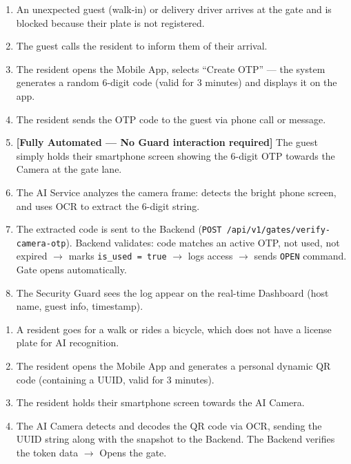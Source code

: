 \documentclass[a4paper]{article}
\begin{document}
\begin{tcolorbox}[colback=white!95!gray, colframe=black, title=Scenario 3: Automated Guest Access via Camera OCR (OTP)]
\begin{enumerate}
    \item An unexpected guest (walk-in) or delivery driver arrives at the gate and is blocked because their plate is not registered.
    \item The guest calls the resident to inform them of their arrival.
    \item The resident opens the Mobile App, selects ``Create OTP'' — the system generates a random 6-digit code (valid for 3 minutes) and displays it on the app.
    \item The resident sends the OTP code to the guest via phone call or message.
    \item \textbf{[Fully Automated — No Guard interaction required]} The guest simply holds their smartphone screen showing the 6-digit OTP towards the Camera at the gate lane.
    \item The AI Service analyzes the camera frame: detects the bright phone screen, and uses OCR to extract the 6-digit string.
    \item The extracted code is sent to the Backend (\texttt{POST /api/v1/gates/verify-camera-otp}). Backend validates: code matches an active OTP, not used, not expired $\rightarrow$ marks \texttt{is\_used = true} $\rightarrow$ logs access $\rightarrow$ sends \texttt{OPEN} command. Gate opens automatically.
    \item The Security Guard sees the log appear on the real-time Dashboard (host name, guest info, timestamp).
\end{enumerate}
\end{tcolorbox}

\vspace{1em}
\begin{tcolorbox}[colback=white!95!gray, colframe=black, title=Scenario 4: Pedestrian/Bicycle Access (QR-based)]
\begin{enumerate}
    \item A resident goes for a walk or rides a bicycle, which does not have a license plate for AI recognition.
    \item The resident opens the Mobile App and generates a personal dynamic QR code (containing a UUID, valid for 3 minutes).
    \item The resident holds their smartphone screen towards the AI Camera.
    \item The AI Camera detects and decodes the QR code via OCR, sending the UUID string along with the snapshot to the Backend. The Backend verifies the token data $\rightarrow$ Opens the gate.
\end{enumerate}
\end{tcolorbox}
\end{document}
